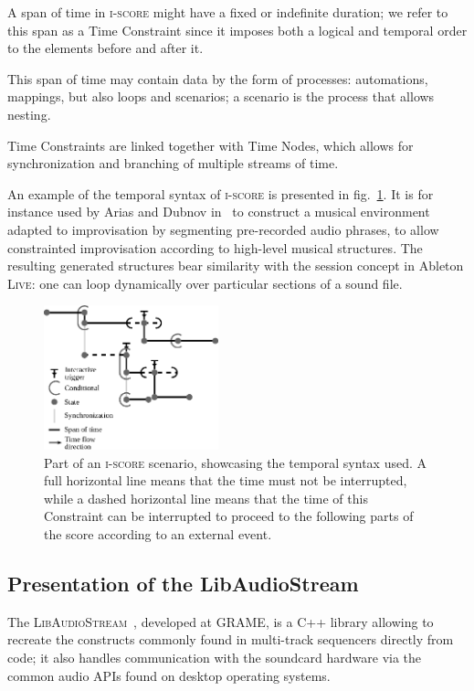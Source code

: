 \documentclass{article}
\newcommand*{\LibAudioStream}{\textsc{LibAudioStream}\xspace}
\newcommand*{\iscore}{\textsc{i-score}\xspace}
\newcommand*{\abletonlive}{Ableton \textsc{Live}\xspace}
\begin{document}
A span of time in \iscore might have a fixed or indefinite duration;
we refer to this span as a Time Constraint since it imposes both a logical and temporal order to the elements before and after it.
 
This span of time may contain data by the form of processes: automations, mappings, but also loops and scenarios; a scenario is the process that allows nesting. 

Time Constraints are linked together with Time Nodes, which allows for synchronization and branching of multiple streams of time.

An example of the temporal syntax of \iscore is presented in fig.~\ref{fig.iscore-example}.
It is for instance used by Arias and Dubnov in~\cite{Arias:VMO-Score} to construct a musical environment adapted to improvisation by segmenting pre-recorded audio phrases, to allow constrainted improvisation according to high-level musical structures.
The resulting generated structures bear similarity with the session concept in \abletonlive: one can loop dynamically over particular sections of a sound file. 

\begin{figure}
	\centering
	\includegraphics[width=0.45\textwidth]{figures/iscore-example.eps}
	\caption{Part of an \iscore scenario, showcasing the temporal syntax used. 
		A full horizontal line means that the time must not be interrupted, 
		while a dashed horizontal line means that the time of this Constraint can be interrupted to proceed 
		to the following parts of the score according to an external event.}
	\label{fig.iscore-example}
\end{figure}

\subsection{Presentation of the LibAudioStream}
The \LibAudioStream~\cite{letzlibaudiostream}, developed at GRAME, is a C++ library allowing to recreate the constructs commonly found in multi-track sequencers directly from code; it also handles communication with the soundcard hardware via the common audio APIs found on desktop operating systems.
\end{document}
